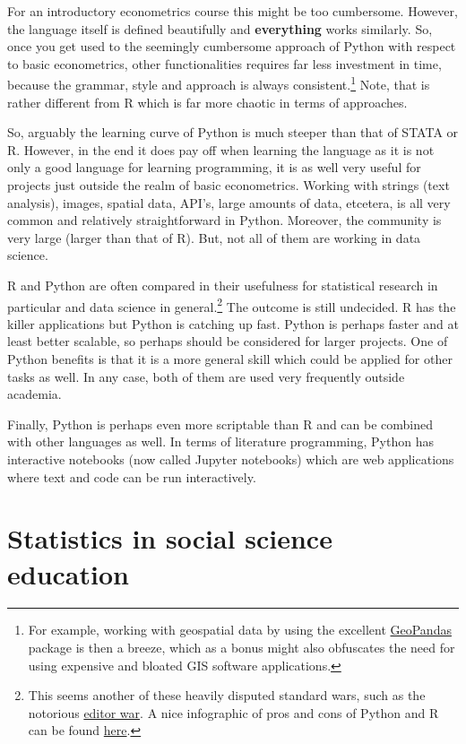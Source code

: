 \documentclass[fleqn,10pt]{SelfArx} %
\begin{document}
For an introductory econometrics course this might be too cumbersome. However, the language itself is defined beautifully and \textbf{everything} works similarly. So, once you get used to the seemingly cumbersome approach of Python with respect to basic econometrics, other functionalities requires far less investment in time, because the grammar, style and approach is always consistent.\footnote{For example, working with geospatial data by using the excellent \href{http://geopandas.org/}{GeoPandas} package is then a breeze, which as a bonus might also obfuscates the need for using expensive and bloated GIS software applications.} Note, that is rather different from R which is far more chaotic in terms of approaches.

So, arguably the learning curve of Python is much steeper than that of STATA or R. However, in the end it does pay off when learning the language as it is not only a good language for learning programming, it is as well very useful for projects just outside the realm of basic econometrics. Working with strings (text analysis), images, spatial data, API's, large amounts of data, etcetera, is all very common and relatively straightforward in Python. Moreover, the community is very large (larger than that of R). But, not all of them are working in data science. 

R and Python are often compared in their usefulness for statistical research in particular and data science in general.\footnote{This seems another of these heavily disputed standard wars, such as the notorious \href{https://en.wikipedia.org/wiki/Editor_war}{editor war}. A nice infographic of pros and cons of Python and R can be found \href{https://www.datacamp.com/community/tutorials/r-or-python-for-data-analysis}{here}.} The outcome is still undecided. R has the killer applications but Python is catching up fast. Python is perhaps faster and at least better scalable, so perhaps should be considered for larger projects. One of Python benefits is that it is a more general skill which could be applied for other tasks as well. In any case, both of them are used very frequently outside academia.

Finally, Python is perhaps even more scriptable than R and can be combined with other languages as well. In terms of literature programming, Python has interactive notebooks (now called Jupyter notebooks) which are web applications where text and code can be run interactively.

\section*{Statistics in social science education}
\end{document}
